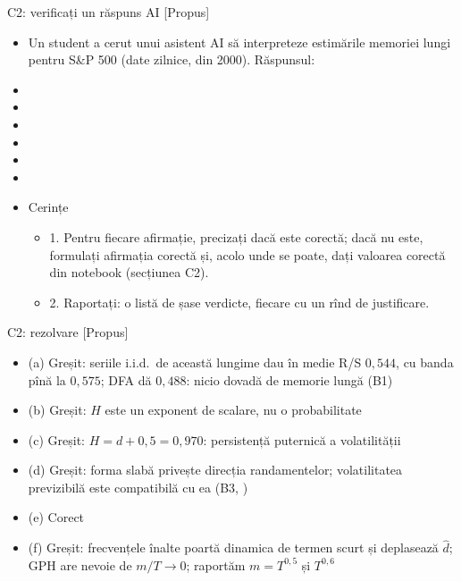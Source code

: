 \begin{frame}{C2: verificați un răspuns AI [Propus]}
\itemsize{\scriptsize}
\begin{itemize}
    \item Un student a cerut unui asistent AI să interpreteze estimările memoriei lungi pentru S\&P 500 (date zilnice, din 2000). Răspunsul:
    \item {}
    \item {}
    \item {}
    \item {}
    \item {}
    \item {}
    \item Cerințe
    \begin{itemize}
        \item 1. Pentru fiecare afirmație, precizați dacă este corectă; dacă nu este, formulați afirmația corectă și, acolo unde se poate, dați valoarea corectă din notebook (secțiunea C2).
        \item 2. Raportați: o listă de șase verdicte, fiecare cu un rînd de justificare.
    \end{itemize}
\end{itemize}
\end{frame}

\ifsolutions
\begin{frame}{C2: rezolvare [Propus]}
\itemsize{\footnotesize}
\begin{itemize}
    \item (a) Greșit: seriile i.i.d.\ de această lungime dau în medie R/S $0{,}544$, cu banda pînă la $0{,}575$; DFA dă $0{,}488$: nicio dovadă de memorie lungă (B1)
    \item (b) Greșit: $H$ este un exponent de scalare, nu o probabilitate
    \item (c) Greșit: $H = d + 0{,}5 = 0{,}970$: persistență puternică a volatilității
    \item (d) Greșit: forma slabă privește direcția randamentelor; volatilitatea previzibilă este compatibilă cu ea (B3, )
    \item (e) Corect
    \item (f) Greșit: frecvențele înalte poartă dinamica de termen scurt și deplasează $\hat d$; GPH are nevoie de $m/T \to 0$; raportăm $m = T^{0{,}5}$ și $T^{0{,}6}$
\end{itemize}
\end{frame}
\fi


